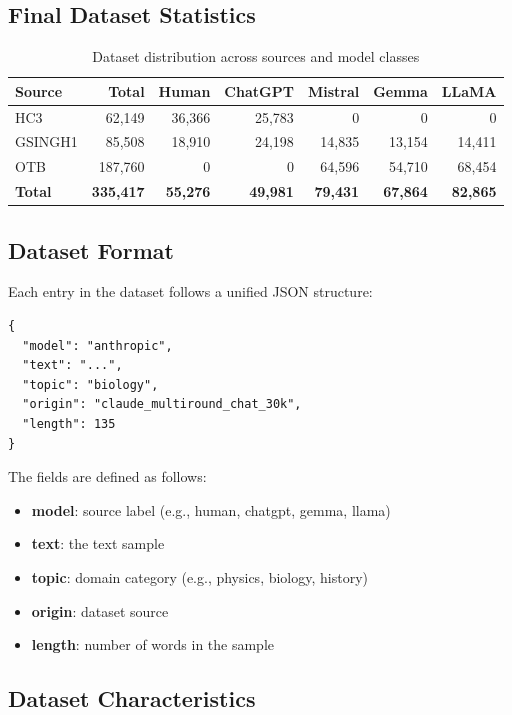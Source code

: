 \documentclass[11pt,a4paper]{article}
\begin{document}
\subsection{Final Dataset Statistics}

\begin{table}[h]
\centering
\begin{tabular}{lrrrrrr}
\hline
\textbf{Source} & \textbf{Total} & \textbf{Human} & \textbf{ChatGPT} & \textbf{Mistral} & \textbf{Gemma} & \textbf{LLaMA} \\
\hline
HC3      & 62,149  & 36,366 & 25,783 & 0      & 0      & 0      \\
GSINGH1  & 85,508  & 18,910 & 24,198 & 14,835 & 13,154 & 14,411 \\
OTB      & 187,760 & 0      & 0      & 64,596 & 54,710 & 68,454 \\
\hline
\textbf{Total} & \textbf{335,417} & \textbf{55,276} & \textbf{49,981} & \textbf{79,431} & \textbf{67,864} & \textbf{82,865} \\
\hline
\end{tabular}
\caption{Dataset distribution across sources and model classes}
\end{table}

\subsection{Dataset Format}

Each entry in the dataset follows a unified JSON structure:

\begin{verbatim}
{
  "model": "anthropic",
  "text": "...",
  "topic": "biology",
  "origin": "claude_multiround_chat_30k",
  "length": 135
}
\end{verbatim}

The fields are defined as follows:

\begin{itemize}
    \item \textbf{model}: source label (e.g., human, chatgpt, gemma, llama)
    \item \textbf{text}: the text sample
    \item \textbf{topic}: domain category (e.g., physics, biology, history)
    \item \textbf{origin}: dataset source
    \item \textbf{length}: number of words in the sample
\end{itemize}

\subsection{Dataset Characteristics}
\end{document}
